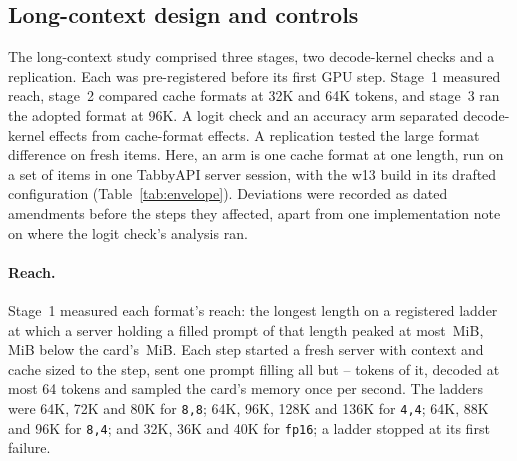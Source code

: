 \documentclass[11pt,letterpaper]{article}
\newcommand{\fmt}[1]{\texttt{#1}}
\begin{document}
\subsection{Long-context design and controls}
\label{app:lc-methods}
The long-context study comprised three stages, two decode-kernel checks
and a replication. Each was pre-registered before its first GPU step.
Stage~1 measured reach, stage~2 compared cache formats at 32K and 64K tokens,
and stage~3 ran the adopted format at 96K. A logit check and an accuracy arm
separated decode-kernel effects from cache-format effects. A replication
tested the large format difference on fresh items. Here, an arm is one cache
format at one length, run on a set of items in one TabbyAPI server session,
with the w13 build in its drafted configuration (Table~\ref{tab:envelope}).
Deviations were recorded as dated amendments before the steps they affected,
apart from one implementation note on where the logit check's analysis ran.

\paragraph{Reach.}
Stage~1 measured each format's reach: the longest length on a registered
ladder at which a server holding a filled prompt of that length peaked at most
\PeLimitMiB\,MiB, \PeHeadroomMiB\,MiB below the card's \PeCardMiB\,MiB. Each
step started a fresh server with context and cache sized to the step, sent one
prompt filling all but \PeFillGapMin--\PeFillGapMax{} tokens of it, decoded at
most 64 tokens and sampled the card's memory once per second. The ladders were
64K, 72K and 80K for \fmt{8,8}; 64K, 96K, 128K and 136K for \fmt{4,4}; 64K, 88K
and 96K for \fmt{8,4}; and 32K, 36K and 40K for \fmt{fp16}; a ladder stopped at
its first failure.
\end{document}
